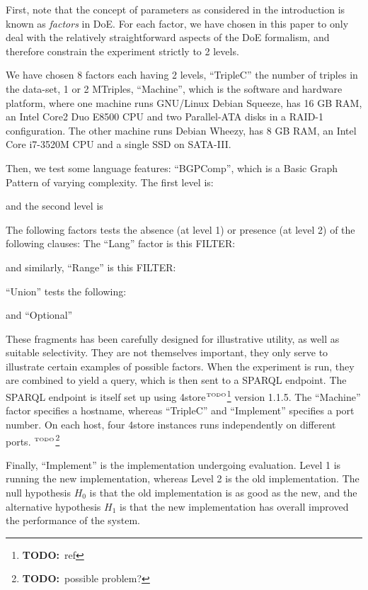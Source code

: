\documentclass{article}
\newcommand{\todo}[1]{\ensuremath{^{\textrm{\tiny{TODO}\normalsize}}}\footnote{\textbf{TODO:}~#1}}
\begin{document}
First, note that the concept of parameters as considered in the
introduction is known as \emph{factors} in DoE. For each factor, we
have chosen in this paper to only deal with the relatively
straightforward aspects of the DoE formalism, and therefore 
constrain the experiment strictly to 2 levels.

We have chosen 8 factors each having 2 levels, ``TripleC'' the number of triples in the
data-set, 1 or 2 MTriples, ``Machine'', which is the software and hardware platform,
where one machine runs GNU/Linux Debian Squeeze, has 16 GB RAM, an
Intel Core2 Duo E8500 CPU and two Parallel-ATA disks in a RAID-1
configuration. The other machine runs Debian Wheezy, has 8 GB RAM, an
Intel Core i7-3520M CPU and a single SSD on SATA-III. 

Then, we test some language features: 
``BGPComp'', which is a Basic Graph Pattern of varying complexity. The
first level is:

and the second level is 


The following factors tests the absence (at level 1) or presence (at level 2) of the following clauses:
The ``Lang'' factor is this FILTER:

and similarly,  ``Range'' is this FILTER:

``Union'' tests the following:

and ``Optional''


These fragments has been carefully designed for illustrative utility,
as well as suitable selectivity. They are not themselves important,
they only serve to illustrate certain examples of possible
factors. When the experiment is run, they are combined to yield a
query, which is then sent to a SPARQL endpoint. The SPARQL endpoint is
itself set up using 4store\todo{ref} version 1.1.5. The ``Machine''
factor specifies a hostname, whereas ``TripleC'' and ``Implement''
specifies a port number. On each host, four 4store instances runs
independently on different ports. \todo{possible problem?}

Finally, ``Implement'' is the implementation undergoing
evaluation. Level 1 is running the new implementation, whereas Level 2
is the old implementation. The null hypothesis $H_0$ is that the old
implementation is as good as the new, and the alternative hypothesis
$H_1$ is that the new implementation has overall improved the
performance of the system.
\end{document}

